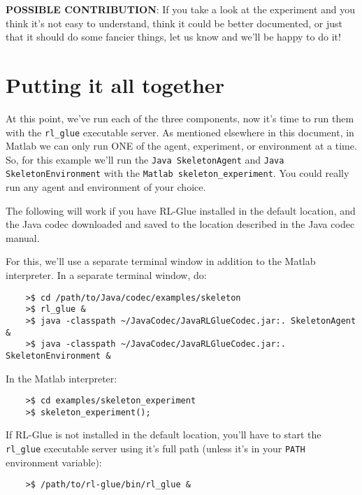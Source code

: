 \documentclass[11pt]{article}
\begin{document}
\textbf{POSSIBLE CONTRIBUTION}: If you take a look at the experiment and you think it's not easy to understand, think it could be better documented, 
or just that it should do some fancier things, let us know and we'll be happy to do it!

\section{Putting it all together}
At this point, we've run each of the three components, now it's time to run them with the \texttt{rl\_glue} executable server.  As mentioned elsewhere in this document, in Matlab we can 
only run ONE of the agent, experiment, or environment at a time.  So, for this example we'll run the \texttt{Java SkeletonAgent} and \texttt{Java SkeletonEnvironment} with the \texttt{Matlab skeleton\_experiment}.  You could really run any agent and environment of your choice.

The following will work if you have RL-Glue installed in the default location, and the Java codec downloaded and saved to the location described in the Java codec manual.

For this, we'll use a separate terminal window in addition to the Matlab interpreter.  In a separate terminal window, do:
\begin{verbatim}
	>$ cd /path/to/Java/codec/examples/skeleton
	>$ rl_glue &
	>$ java -classpath ~/JavaCodec/JavaRLGlueCodec.jar:. SkeletonAgent &
	>$ java -classpath ~/JavaCodec/JavaRLGlueCodec.jar:. SkeletonEnvironment &
\end{verbatim}

In the Matlab interpreter:
\begin{verbatim}
	>$ cd examples/skeleton_experiment
	>$ skeleton_experiment();
\end{verbatim}

If RL-Glue is not installed in the default location, you'll have to start the \texttt{rl\_glue} executable server using it's full path (unless it's in your \texttt{PATH} environment variable):
\begin{verbatim}
	>$ /path/to/rl-glue/bin/rl_glue &
\end{verbatim}
\end{document}
